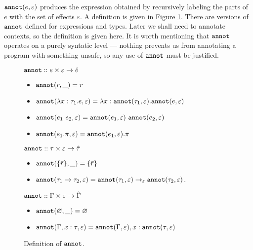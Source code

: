 $\mathtt{annot}(e, \varepsilon)$ produces the expression obtained by recursively labeling the parts of $e$ with the set of effects $\varepsilon$. A definition is given in Figure \ref{fig:annot_defn}. There are versions of $\mathtt{annot}$ defined for expressions and types. Later we shall need to annotate contexts, so the definition is given here. It is worth mentioning that $\mathtt{annot}$ operates on a purely syntatic level --- nothing prevents us from annotating a program with something unsafe, so any use of $\mathtt{annot}$ must be justified.

\begin{figure}[h]
\vspace{-5pt}

$\mathtt{annot} :: e \times \varepsilon \rightarrow \hat e$

\begin{itemize}
	\setlength\itemsep{-0.2em}
	\item[] $\mathtt{annot}(r, \_) = r$
	\item[] $\mathtt{annot}(\lambda x: \tau_1 . e, \varepsilon) = \lambda x: \mathtt{annot}(\tau_1, \varepsilon) . \mathtt{annot}(e, \varepsilon)$
	\item[] $\mathtt{annot}(e_1~e_2, \varepsilon) = \mathtt{annot}(e_1, \varepsilon)~\mathtt{annot}(e_2, \varepsilon)$
	\item[] $\mathtt{annot}(e_1.\pi, \varepsilon) = \mathtt{annot}(e_1, \varepsilon).\pi$
\end{itemize}
	
$\mathtt{annot} :: \tau \times \varepsilon \rightarrow \hat \tau$

\begin{itemize}
	\setlength\itemsep{-0.2em}
	\item[] $\mathtt{annot}(\{ \bar r \}, \_) = \{ \bar r \}$
	\item[] $\mathtt{annot}(\tau_1 \rightarrow \tau_2, \varepsilon) = \mathtt{annot}(\tau_1, \varepsilon) \rightarrow_{\varepsilon} \mathtt{annot}(\tau_2, \varepsilon)$.	
\end{itemize}

$\mathtt{annot} :: \Gamma \times \varepsilon \rightarrow \hat \Gamma$

\begin{itemize}
	\setlength\itemsep{-0.2em}
	\item[] $\mathtt{annot}(\varnothing, \_) = \varnothing$
	\item[] $\mathtt{annot}(\Gamma, x: \tau, \varepsilon) = \mathtt{annot}(\Gamma, \varepsilon), x: \mathtt{annot}(\tau, \varepsilon)$
\end{itemize}

\vspace{-7pt}
\caption{Definition of $\mathtt{annot}$.}
\label{fig:annot_defn}
\end{figure}

